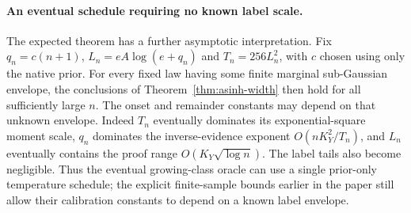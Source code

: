 \paragraph{An eventual schedule requiring no known label scale.}
The expected theorem has a further asymptotic interpretation.  Fix
$q_n=c(n+1)$, $L_n=eA\log(e+q_n)$ and $T_n=256L_n^2$, with $c$
chosen using only the native prior.  For every fixed law having some
finite marginal sub-Gaussian envelope, the conclusions of
Theorem~\ref{thm:asinh-width} then hold for all sufficiently large $n$.
The onset and remainder constants may depend on that unknown envelope.
Indeed $T_n$ eventually dominates its exponential-square moment scale,
$q_n$ dominates the inverse-evidence exponent $O(nK_Y^2/T_n)$, and
$L_n$ eventually contains the proof range $O(K_Y\sqrt{\log n})$.
The label tails also become negligible.  Thus the eventual growing-class
oracle can use a single prior-only temperature schedule; the explicit
finite-sample bounds earlier in the paper still allow their calibration
constants to depend on a known label envelope.
